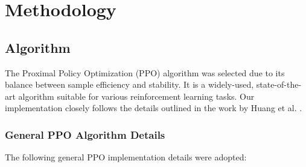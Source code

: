 \documentclass{article}
\begin{document}
\section{Methodology}

\subsection{Algorithm}
The Proximal Policy Optimization (PPO) algorithm was selected due to its balance between sample efficiency and stability. It is a widely-used, state-of-the-art algorithm suitable for various reinforcement learning tasks. Our implementation closely follows the details outlined in the work by Huang et al. \cite{shengyi2022the37implementation}.

\subsubsection{General PPO Algorithm Details}
The following general PPO implementation details were adopted:
\end{document}
